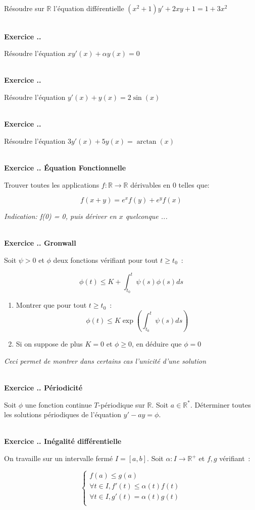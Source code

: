 \documentclass{article}
\newcommand{\mb}[1]{\mathbb{#1}}
\newcounter{exo}
\newcommand{\exercice}[1][\null]{\textbf{\\ Exercice \thesection.\theexo. #1} \addtocounter{exo}{1}}
\begin{document}
Résoudre sur $\mb{R}$ l'équation différentielle $(x^2+1)y'+2xy+1= 1 + 3x^2 $

\exercice 

Résoudre l'équation $x y'(x) + \alpha y(x) = 0$ 


\exercice 

Résoudre l'équation $y'(x) + y(x) = 2 \sin (x)$

\exercice 

Résoudre l'équation $3 y'(x) + 5 y(x) = \arctan (x)$

\exercice[Équation Fonctionnelle]

Trouver toutes les applications $f : \mb{R} \to \mb{R}$ 
dérivables en $0$ telles que: 

\begin{equation*}
    f(x + y) = e^x f(y) + e^y f(x)
\end{equation*}

\emph{Indication: f(0) = 0, puis dériver en $x$ quelconque ...}

\exercice[Gronwall]

Soit $\psi > 0$ et $\phi$ deux fonctions vérifiant 
pour tout $t \geq t_0$~:

\begin{equation*}
    \phi (t) \leq K + \int_{t_0}^t \psi (s) \phi (s) ds
\end{equation*}

\begin{enumerate}
    \item Montrer que pour tout $t \geq t_0$~:
\begin{equation*}
    \phi (t) \leq K \exp \left(  \int_{t_0}^t \psi (s) ds \right) 
\end{equation*}

    \item Si on suppose de plus $K = 0$ et $\phi \geq 0$, 
        en déduire que $\phi = 0$
\end{enumerate}

\emph{Ceci permet de montrer dans certains cas l'unicité d'une solution}


\exercice[Périodicité]
Soit $\phi$ une fonction continue $T$-périodique sur $\mb{R}$.
Soit $a \in \mb{R}^*$. Déterminer toutes les solutions périodiques 
de l'équation $y' - ay = \phi$.

\exercice[Inégalité différentielle]

On travaille sur un intervalle fermé $I = [a,b]$.
Soit $\alpha : I \to \mb{R}^+$ et $f,g$ vérifiant~:

\begin{equation*}
    \begin{cases}
        f(a) \leq g(a) \\
        \forall t \in I, f'(t) \leq \alpha (t) f(t) \\
        \forall t \in I, g'(t)  = \alpha (t) g(t) \\
    \end{cases}
\end{equation*}
\end{document}
